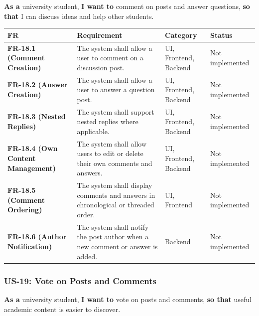 \documentclass[12pt]{article}
\renewcommand{\baselinestretch}{1.5}
\begin{document}
\textbf{As a} university student, \textbf{I want to} comment on posts and answer questions, \textbf{so that} I can discuss ideas and help other students.
\par\medskip

\begingroup
\small
\renewcommand{\baselinestretch}{1.0}\selectfont
\renewcommand{\arraystretch}{1.15}
\setlength{\tabcolsep}{6pt}
\begin{longtable}{|>{\raggedright\arraybackslash}p{}|>{\raggedright\arraybackslash}p{}|>{\raggedright\arraybackslash}p{}|>{\raggedright\arraybackslash}p{}|}
\hline
\textbf{FR} & \textbf{Requirement} & \textbf{Category} & \textbf{Status} \\ \hline
\endhead
\textbf{FR-18.1 (Comment Creation)} & The system shall allow a user to comment on a discussion post. & UI, Frontend, Backend & Not implemented \\ \hline
\textbf{FR-18.2 (Answer Creation)} & The system shall allow a user to answer a question post. & UI, Frontend, Backend & Not implemented \\ \hline
\textbf{FR-18.3 (Nested Replies)} & The system shall support nested replies where applicable. & UI, Frontend, Backend & Not implemented \\ \hline
\textbf{FR-18.4 (Own Content Management)} & The system shall allow users to edit or delete their own comments and answers. & UI, Frontend, Backend & Not implemented \\ \hline
\textbf{FR-18.5 (Comment Ordering)} & The system shall display comments and answers in chronological or threaded order. & UI, Frontend & Not implemented \\ \hline
\textbf{FR-18.6 (Author Notification)} & The system shall notify the post author when a new comment or answer is added. & Backend & Not implemented \\ \hline
\end{longtable}
\endgroup
\par\medskip

\hypertarget{sec:us-19-vote-on-posts-and-comments}{}
\subsubsection*{US-19: Vote on Posts and Comments}
\par\medskip

\textbf{As a} university student, \textbf{I want to} vote on posts and comments, \textbf{so that} useful academic content is easier to discover.
\par\medskip
\end{document}
